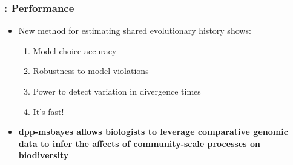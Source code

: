 



\begin{frame}
    \frametitle{\dppmsbayes: Performance}
    \begin{itemize}
        \item<1-> New method for estimating shared evolutionary history shows:
            \begin{enumerate}
                \item<1-> Model-choice accuracy 
                \item<1-> Robustness to model violations
                \item<1-> Power to detect variation in divergence times
                \item<1-> It's fast!
            \end{enumerate}
        \item<2-> \textbf{dpp-msbayes allows biologists to leverage comparative
                genomic data to infer the affects of community-scale processes
                on biodiversity}
    \end{itemize}

\end{frame}
